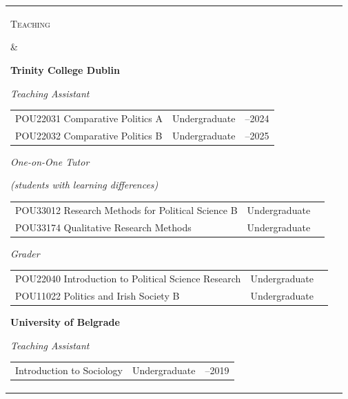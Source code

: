 \documentclass[10pt, a4paper]{article}
\makeatletter
\newlength{\cvlabelwidth}
\newlength{\cvcontentwidth}
\newlength{\cvsectionabove}
\newlength{\cvitemgap}
\newcommand{\cvbetween}{\par\vspace{\cvitemgap}}
\newenvironment{cvbody}{%
  \setlength{\extrarowheight}{2pt}%
  \begin{longtable}{%
    @{}
    >{\small\raggedright}p{\cvlabelwidth}
    @{\hspace{6pt}}
    >{\small}p{\cvcontentwidth}
    @{}
  }
}{%
  \end{longtable}%
}
\newcommand{\cvsection}[2]{%
  \noalign{\vspace{\cvsectionabove}}%
  \parbox[t]{\cvlabelwidth}{\raggedright\strut\textsc{#1}} &
  \parbox[t]{\cvcontentwidth}{#2}\tabularnewline
}
\newlength{\cvteachgapone}
\newlength{\cvteachgaptwo}
\newlength{\cvteachlevelwidth}
\newlength{\cvteachyearswidth}
\newlength{\cvteachcoursewidth}
\newenvironment{cvteachblock}{%
  \begin{tabular}[t]{@{}%
    >{\raggedright\arraybackslash}p{\cvteachcoursewidth}%
    @{\hspace{\cvteachgapone}}%
    >{\raggedright\arraybackslash}p{\cvteachlevelwidth}%
    @{\hspace{\cvteachgaptwo}}%
    >{\raggedleft\arraybackslash}p{\cvteachyearswidth}@{}}%
}{%
  \end{tabular}%
}
\newcommand{\cvteachrow}[3]{\hspace{0.75em}#1 & #2 & #3\tabularnewline}
\makeatother
\begin{document}
\begin{cvbody}
\cvsection{Teaching}{%
  \noindent\textbf{Trinity College Dublin}\par
  \noindent\textit{Teaching Assistant}\par
  \begin{cvteachblock}%
  \cvteachrow{POU22031 Comparative Politics A}{Undergraduate}{2021--2024}%
  \cvteachrow{POU22032 Comparative Politics B}{Undergraduate}{2022--2025}%
  \end{cvteachblock}\par
  \noindent\textit{One-on-One Tutor}\par
  \noindent\textit{(students with learning differences)}\par
  \begin{cvteachblock}%
  \cvteachrow{POU33012 Research Methods for Political Science B}{Undergraduate}{2026}%
  \cvteachrow{POU33174 Qualitative Research Methods}{Undergraduate}{2026}%
  \end{cvteachblock}\par
  \noindent\textit{Grader}\par
  \begin{cvteachblock}%
  \cvteachrow{POU22040 Introduction to Political Science Research}{Undergraduate}{2024}%
  \cvteachrow{POU11022 Politics and Irish Society B}{Undergraduate}{2023}%
  \end{cvteachblock}\par
  \cvbetween
  \noindent\textbf{University of Belgrade}\par
  \noindent\textit{Teaching Assistant}\par
  \begin{cvteachblock}%
  \cvteachrow{Introduction to Sociology}{Undergraduate}{2018--2019}%
  \end{cvteachblock}%
}


\end{cvbody}
\end{document}
